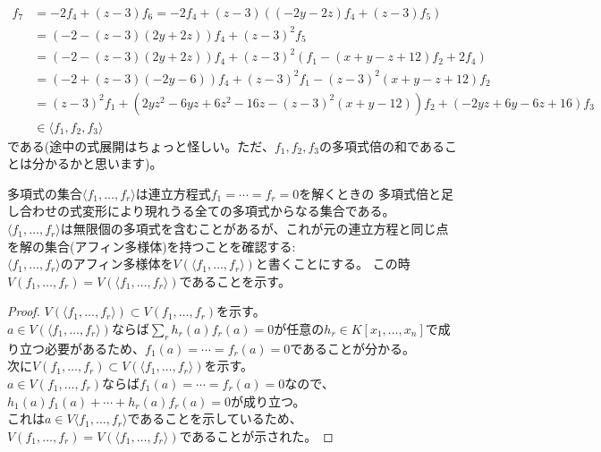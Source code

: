 \begin{frame}
	\begin{align*}
		f_7 & = -2f_4+(z-3)f_6=-2f_4+(z-3)((-2y-2z)f_4+(z-3)f_5)                      \\
		    & = (-2-(z-3)(2y+2z))f_4+(z-3)^2f_5                                       \\
		    & = (-2-(z-3)(2y+2z))f_4+(z-3)^2(f_1-(x+y-z+12)f_2+2f_4)                  \\
		    & = (-2+(z-3)(-2y-6))f_4+(z-3)^2f_1-(z-3)^2(x+y-z+12)f_2                  \\
		    & = (z-3)^2f_1+(2yz^2-6yz+6z^2-16z-(z-3)^2(x+y-12))f_2+(-2yz+6y-6z+16)f_3 \\
		    & \in \langle f_1, f_2, f_3\rangle
	\end{align*}
	である(途中の式展開はちょっと怪しい。ただ、$f_1,f_2,f_3$の多項式倍の和であることは分かるかと思います)。
\end{frame}

\begin{frame}
	多項式の集合$\langle f_1,\ldots,f_r\rangle$は連立方程式$f_1=\cdots=f_r=0$を解くときの
	多項式倍と足し合わせの式変形により現れうる全ての多項式からなる集合である。 \\
	$\langle f_1,\ldots,f_r\rangle$は無限個の多項式を含むことがあるが、これが元の連立方程と同じ点を解の集合(アフィン多様体)を持つことを確認する: \\
	$\langle f_1,\ldots,f_r\rangle$のアフィン多様体を$V(\langle f_1,\ldots,f_r\rangle)$と書くことにする。
	この時$V(f_1,\ldots,f_r)=V(\langle f_1,\ldots,f_r\rangle)$であることを示す。 \\

	\begin{proof}
		$V(\langle f_1,\ldots,f_r\rangle) \subset V(f_1,\ldots,f_r)$を示す。 \\
		$a \in V(\langle f_1,\ldots,f_r\rangle)$ならば$\sum_r h_r(a) f_r(a) = 0$が任意の$h_r \in K[x_1,\ldots, x_n]$で成り立つ必要があるため、$f_1(a)=\cdots=f_r(a)=0$であることが分かる。\\

		次に$V(f_1,\ldots,f_r) \subset V(\langle f_1,\ldots,f_r\rangle)$を示す。\\
		$a \in V(f_1,\ldots,f_r)$ならば$f_1(a)=\cdots=f_r(a)=0$なので、$h_1(a)f_1(a)+\cdots+h_r(a)f_r(a)=0$が成り立つ。\\
		これは$a \in V\langle f_1,\ldots,f_r\rangle$であることを示しているため、
		$V(f_1,\ldots,f_r)=V(\langle f_1,\ldots,f_r\rangle)$であることが示された。
	\end{proof}

\end{frame}

